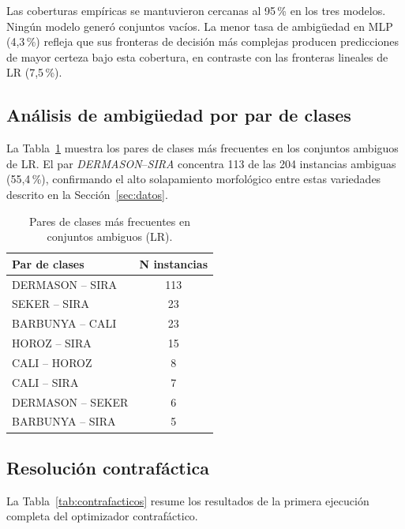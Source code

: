 \documentclass[conference]{IEEEtran}
\begin{document}
Las coberturas empíricas se mantuvieron cercanas al 95\,\% en los tres
modelos. Ningún modelo generó conjuntos vacíos. La menor tasa de
ambigüedad en MLP (4{,}3\,\%) refleja que sus fronteras de decisión más
complejas producen predicciones de mayor certeza bajo esta cobertura, en
contraste con las fronteras lineales de LR (7{,}5\,\%).

\subsection{Análisis de ambigüedad por par de clases}

La Tabla~\ref{tab:pares} muestra los pares de clases más frecuentes en
los conjuntos ambiguos de LR. El par \textit{DERMASON}--\textit{SIRA}
concentra 113 de las 204 instancias ambiguas (55{,}4\,\%), confirmando el
alto solapamiento morfológico entre estas variedades descrito en la
Sección~\ref{sec:datos}.

\begin{table}[h]
\centering
\caption{Pares de clases más frecuentes en conjuntos ambiguos (LR).}
\label{tab:pares}
\begin{tabular}{lc}
\toprule
\textbf{Par de clases} & \textbf{N instancias} \\
\midrule
DERMASON -- SIRA  & 113 \\
SEKER -- SIRA     & 23  \\
BARBUNYA -- CALI  & 23  \\
HOROZ -- SIRA     & 15  \\
CALI -- HOROZ     & 8   \\
CALI -- SIRA      & 7   \\
DERMASON -- SEKER & 6   \\
BARBUNYA -- SIRA  & 5   \\
\bottomrule
\end{tabular}
\end{table}

\subsection{Resolución contrafáctica}

La Tabla~\ref{tab:contrafacticos} resume los resultados de la primera
ejecución completa del optimizador contrafáctico.

\begin{table}[t]
\centering
\caption{Resultados de resolución contrafáctica.}
\label{tab:contrafacticos}
\end{table}
\end{document}
